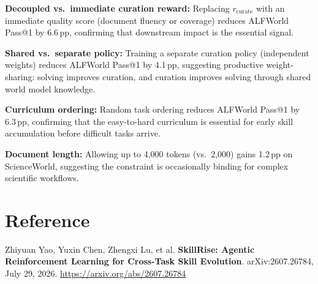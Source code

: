 \documentclass[10pt,twocolumn]{article}
\begin{document}
\textbf{Decoupled vs.\ immediate curation reward:} Replacing
$r_{\mathrm{curate}}$ with an immediate quality score (document fluency
or coverage) reduces ALFWorld Pass@1 by 6.6\,pp, confirming that
downstream impact is the essential signal.

\textbf{Shared vs.\ separate policy:} Training a separate curation policy
(independent weights) reduces ALFWorld Pass@1 by 4.1\,pp, suggesting
productive weight-sharing: solving improves curation, and curation
improves solving through shared world model knowledge.

\textbf{Curriculum ordering:} Random task ordering reduces ALFWorld
Pass@1 by 6.3\,pp, confirming that the easy-to-hard curriculum is
essential for early skill accumulation before difficult tasks arrive.

\textbf{Document length:} Allowing up to 4,000 tokens (vs.\ 2,000) gains
1.2\,pp on ScienceWorld, suggesting the constraint is occasionally binding
for complex scientific workflows.

\section*{Reference}

Zhiyuan Yao, Yuxin Chen, Zhengxi Lu, et al.
\textbf{SkillRise: Agentic Reinforcement Learning for Cross-Task Skill
Evolution}.
arXiv:2607.26784, July 29, 2026.
\url{https://arxiv.org/abs/2607.26784}
\end{document}

